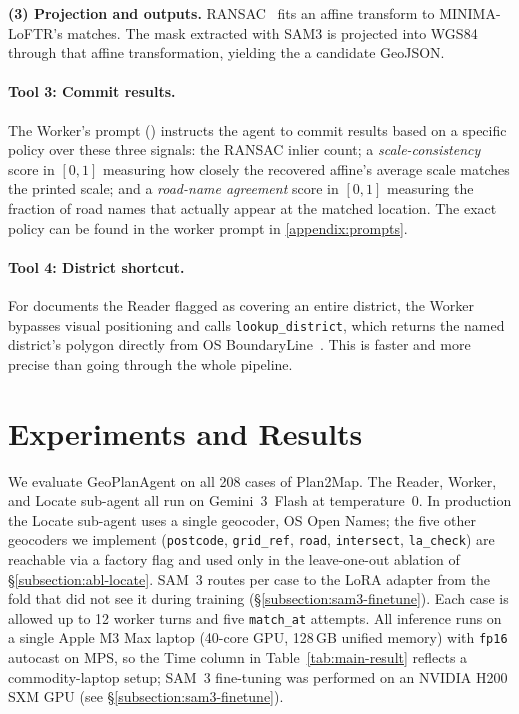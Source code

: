 \documentclass[11pt]{article}
\begin{document}
\textbf{(3) Projection and outputs.} RANSAC~\cite{Ransac} fits an affine transform to MINIMA-LoFTR's matches. The mask extracted with SAM3 is projected into WGS84 through that affine transformation, yielding the a candidate GeoJSON.

\paragraph{Tool 3: Commit results.}
The Worker's prompt () instructs the agent to commit results based on a specific policy over these three signals:  the RANSAC inlier count; a \emph{scale-consistency} score in $[0,1]$ measuring how closely the recovered affine's average scale matches the printed scale; and a \emph{road-name agreement} score in $[0,1]$ measuring the fraction of road names that actually appear at the matched location. The exact policy can be found in the worker prompt in \ref{appendix:prompts}.

\paragraph{Tool 4: District shortcut.}
For documents the Reader flagged as covering an entire district, the Worker bypasses visual positioning and calls \texttt{lookup\_district}, which returns the named district's polygon directly from OS BoundaryLine~\cite{os_boundary_line}. This is faster and more precise than going through the whole pipeline.




\section{Experiments and Results}
\label{section:results}

We evaluate GeoPlanAgent on all 208 cases of Plan2Map. The Reader, Worker, and Locate sub-agent all run on Gemini~3~Flash at temperature~0. In production the Locate sub-agent uses a single geocoder, OS Open Names; the five other geocoders we implement (\texttt{postcode}, \texttt{grid\_ref}, \texttt{road}, \texttt{intersect}, \texttt{la\_check}) are reachable via a factory flag and used only in the leave-one-out ablation of \S\ref{subsection:abl-locate}. SAM~3 routes per case to the LoRA adapter from the fold that did not see it during training (\S\ref{subsection:sam3-finetune}). Each case is allowed up to 12 worker turns and five \texttt{match\_at} attempts. All inference runs on a single Apple M3 Max laptop (40-core GPU, 128\,GB unified memory) with \texttt{fp16} autocast on MPS, so the Time column in Table~\ref{tab:main-result} reflects a commodity-laptop setup; SAM~3 fine-tuning was performed on an NVIDIA H200 SXM GPU (see \S\ref{subsection:sam3-finetune}).
\end{document}
